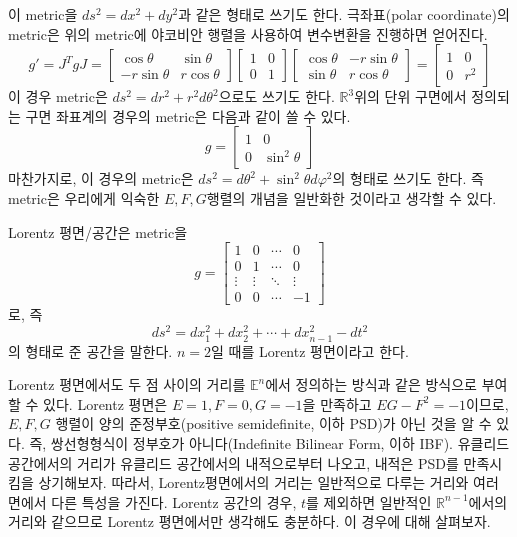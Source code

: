 \documentclass[10pt,a4paper]{article}
\begin{document}
이 metric을 $ds^{2} = dx^{2} + dy^{2}$과 같은 형태로 쓰기도 한다. 극좌표(polar coordinate)의 metric은 위의 metric에 야코비안 행렬을 사용하여 변수변환을 진행하면 얻어진다.
\[g' = J^{T}gJ = \begin{bmatrix}\cos \theta&\sin \theta \\-r\sin \theta&r\cos \theta\end{bmatrix} \begin{bmatrix}1&0\\0&1\end{bmatrix} \begin{bmatrix}\cos \theta&-r\sin \theta\\\sin \theta &r\cos \theta\end{bmatrix} = \begin{bmatrix}1&0\\0&r^{2}\end{bmatrix}\]
이 경우 metric은 $ds^{2} = dr^{2} + r^2d\theta^{2}$으로도 쓰기도 한다. $\mathbb{R}^{3}$위의 단위 구면에서 정의되는 구면 좌표계의 경우의 metric은 다음과 같이 쓸 수 있다.
\[g = \begin{bmatrix}1&0\\0&\sin ^{2}\theta\end{bmatrix}\]
마찬가지로, 이 경우의 metric은 $ds^{2} = d\theta^{2} + \sin^{2}\theta d\varphi^{2}$의 형태로 쓰기도 한다. 즉 metric은 우리에게 익숙한 $E, F, G$행렬의 개념을 일반화한 것이라고 생각할 수 있다.
\begin{tcolorbox}[title=Lorentz 평면/공간의 metric]
Lorentz 평면/공간은 metric을
\[ g = \begin{bmatrix} 1 & 0 & \cdots & 0 \\ 0 & 1 & \cdots & 0 \\ \vdots & \vdots & \ddots & \vdots \\
0 & 0 & \cdots & -1 \end{bmatrix}\]
로, 즉 \[ds^2=dx_1^2+dx_2^2+\cdots +dx_{n-1}^2-dt^2\]의 형태로 준 공간을 말한다. $n=2$일 때를 Lorentz 평면이라고 한다.
\end{tcolorbox}
Lorentz 평면에서도 두 점 사이의 거리를 $\mathbb{E}^n$에서 정의하는 방식과 같은 방식으로 부여할 수 있다. Lorentz 평면은 $E=1, F=0, G=-1$을 만족하고 $EG-F^2=-1$이므로, $E, F, G$ 행렬이 양의 준정부호(positive semidefinite, 이하 PSD)가 아닌 것을 알 수 있다. 즉, 쌍선형형식이 정부호가 아니다(Indefinite Bilinear Form, 이하 IBF). 유클리드 공간에서의 거리가 유클리드 공간에서의 내적으로부터 나오고, 내적은 PSD를 만족시킴을 상기해보자. 따라서, Lorentz평면에서의 거리는 일반적으로 다루는 거리와 여러 면에서 다른 특성을 가진다. Lorentz 공간의 경우, $t$를 제외하면 일반적인 $\mathbb{R}^{n-1}$에서의 거리와 같으므로 Lorentz 평면에서만 생각해도 충분하다. 이 경우에 대해 살펴보자.
\end{document}
